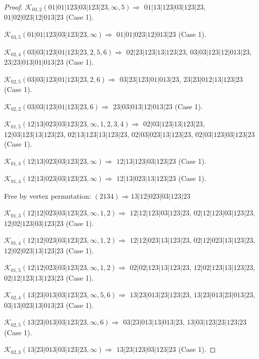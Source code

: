 \documentclass[12pt]{article}
\theoremstyle{plain}
\theoremstyle{definition}
\theoremstyle{remark}
\newcommand{\fancy}[1]{\mathcal{#1}}
\def\K{\fancy{K}}
\begin{document}
\begin{proof}
	$\K_{03,2}(01|01|123|03|123|23,\infty,5)\Rightarrow $ $01|13|123|03|123|23$, $01|02|023|12|013|23$ (Case 1).
	
	$\K_{03,5}(01|01|123|03|123|23,\infty)\Rightarrow $ $01|01|023|12|013|23$ (Case 1).
	
	
	\bigskip
	
	$\K_{02,4}(03|03|123|01|123|23,2, 5, 6)\Rightarrow $ $02|23|123|13|123|23$, $03|03|123|12|013|23$, $23|23|013|01|013|23$ (Case 1).
	
	$\K_{02,5}(03|03|123|01|123|23,2, 6)\Rightarrow $ $03|23|123|01|013|23$, $23|23|012|13|123|23$ (Case 1).
	
	$\K_{02,2}(03|03|123|01|123|23,6)\Rightarrow $ $23|03|013|12|013|23$ (Case 1).
	
	
	\bigskip
	
	$\K_{01,5}(12|13|023|03|123|23,\infty,1, 2, 3, 4)\Rightarrow $ $02|03|123|13|123|23$, $12|03|123|13|123|23$, $02|13|123|13|123|23$, $02|03|023|13|123|23$, $02|03|123|03|123|23$ (Case 1).
	
	$\K_{01,3}(12|13|023|03|123|23,\infty)\Rightarrow $ $12|13|123|03|123|23$ (Case 1).
	
	$\K_{01,4}(12|13|023|03|123|23,\infty)\Rightarrow $ $12|13|023|13|123|23$ (Case 1).
	
	
	
	Free by vertex permutation: $(2 1 3 4)\Rightarrow 13|12|023|03|123|23$
	
	
	
	\bigskip
	
	$\K_{01,3}(12|12|023|03|123|23,\infty,1, 2)\Rightarrow $ $12|12|123|03|123|23$, $02|12|123|03|123|23$, $12|02|123|03|123|23$ (Case 1).
	
	$\K_{01,4}(12|12|023|03|123|23,\infty,1, 2)\Rightarrow $ $12|12|023|13|123|23$, $02|12|023|13|123|23$, $12|02|023|13|123|23$ (Case 1).
	
	$\K_{01,5}(12|12|023|03|123|23,\infty,1, 2)\Rightarrow $ $02|02|123|13|123|23$, $12|02|123|13|123|23$, $02|12|123|13|123|23$ (Case 1).
	
	
	\bigskip
	
	$\K_{02,4}(13|23|013|03|123|23,\infty,5, 6)\Rightarrow $ $13|23|013|23|123|23$, $13|23|013|23|013|23$, $03|13|023|13|013|23$ (Case 1).
	
	$\K_{02,5}(13|23|013|03|123|23,\infty,6)\Rightarrow $ $03|23|013|13|013|23$, $13|03|123|23|123|23$ (Case 1).
	
	$\K_{02,3}(13|23|013|03|123|23,\infty)\Rightarrow $ $13|23|123|03|123|23$ (Case 1).
	

\end{proof}
\end{document}
